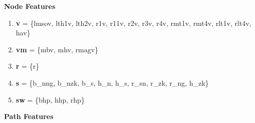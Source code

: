 \documentclass{report} %
\begin{document}
\textbf{Node Features}

\begin{enumerate}

    \item \textbf{v} = \{lmsov, lth1v, lth2v, r1v, r11v, r2v, r3v, r4v, rmt1v, rmt4v, rlt1v, rlt4v, hav\}

    \item \textbf{vm} = \{mbv, mhv, rmagv\}

    \item \textbf{r} = \{r\}

    \item \textbf{s} = \{b\_nng, b\_nzk, b\_s, h\_n, h\_s, r\_sn, r\_zk, r\_ng, h\_zk\}

    \item \textbf{sw} = \{bhp, hhp, rhp\}
\end{enumerate}

\textbf{Path Features}
\end{document}
